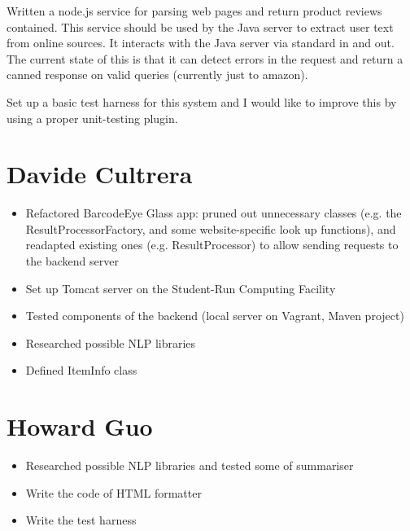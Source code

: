 \documentclass[12pt,a4paper]{report}
\begin{document}
Written a node.js service for parsing web pages and return product reviews contained. This service should be used by the Java server to extract user text from online sources. It interacts with the Java server via standard in and out. The current state of this is that it can detect errors in the request and return a canned response on valid queries (currently just to amazon). 

Set up a basic test harness for this system and I would like to improve this by using a proper unit-testing plugin.

\section{Davide Cultrera}

\begin{itemize}

	\item Refactored BarcodeEye Glass app: pruned out unnecessary classes (e.g. the ResultProcessorFactory, and some website-specific look up functions), and readapted existing ones (e.g. ResultProcessor) to allow sending requests to the backend server

	\item Set up Tomcat server on the Student-Run Computing Facility

	\item Tested components of the backend (local server on Vagrant, Maven project)

	\item Researched possible NLP libraries

	\item Defined ItemInfo class
	
\end{itemize}

\section{Howard Guo}

\begin{itemize}

\item Researched possible NLP libraries and tested some of summariser

\item Write the code of HTML formatter

\item Write the test harness

\end{itemize}
\end{document}
